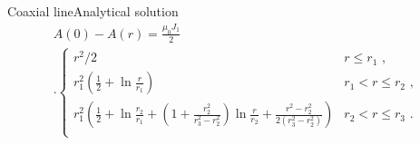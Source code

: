 %
%
%
%
%

\begin{frame}{Coaxial line}{Analytical solution}
  \begin{multline*}
    A(0)-A(r) = \frac{\mu_0J_1}{2} \\ \cdot
    \begin{cases}
      r^2/2 & r \le r_1\text{~,} \\
      r_1^2\left(\frac{1}{2}+\ln\frac{r}{r_1}\right)
      & r_1 < r \le r_2\text{~,} \\
      r_1^2\left(\frac{1}{2}+\ln\frac{r_2}{r_1}
        +\left(1+\frac{r_2^2}{r_3^2-r_2^2}\right)\ln\frac{r}{r_2}
        +\frac{r^2-r_2^2}{2(r_3^2-r_2^2)}\right)
      & r_2 < r \le r_3\text{~.} \\
    \end{cases}
  \end{multline*}
  \vfill
  \centering
  
\end{frame}

